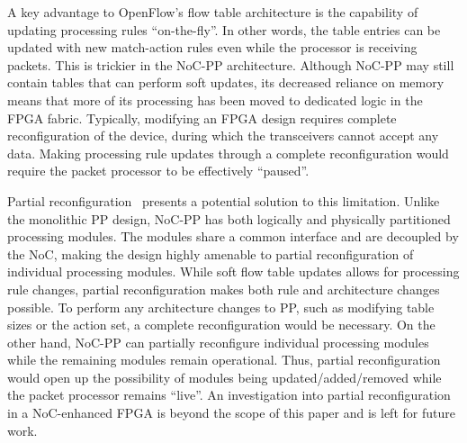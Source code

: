 %
%

A key advantage to OpenFlow's flow table architecture is the capability of updating processing rules ``on-the-fly''. In other words, the table entries can be updated with new match-action rules even while the processor is receiving packets.
This is trickier in the NoC-PP architecture.
Although NoC-PP may still contain tables that can perform soft updates, its decreased reliance on memory means that more of its processing has been moved to dedicated logic in the FPGA fabric.
Typically, modifying an FPGA design requires complete reconfiguration of the device, during which the transceivers cannot accept any data.
Making processing rule updates through a complete reconfiguration would require the packet processor to be effectively ``paused''.

Partial reconfiguration~\cite{kao2005benefits} presents a potential solution to this limitation.
Unlike the monolithic PP design, NoC-PP has both logically and physically partitioned processing modules.
The modules share a common interface and are decoupled by the NoC, making the design highly amenable to partial reconfiguration of individual processing modules.
While soft flow table updates allows for processing rule changes, partial reconfiguration makes both rule and architecture changes possible.
To perform any architecture changes to PP, such as modifying table sizes or the action set, a complete reconfiguration would be necessary.
On the other hand, NoC-PP can partially reconfigure individual processing modules while the remaining modules remain operational.
Thus, partial reconfiguration would open up the possibility of modules being updated/added/removed while the packet processor remains ``live''.
An investigation into partial reconfiguration in a NoC-enhanced FPGA is beyond the scope of this paper and is left for future work.

